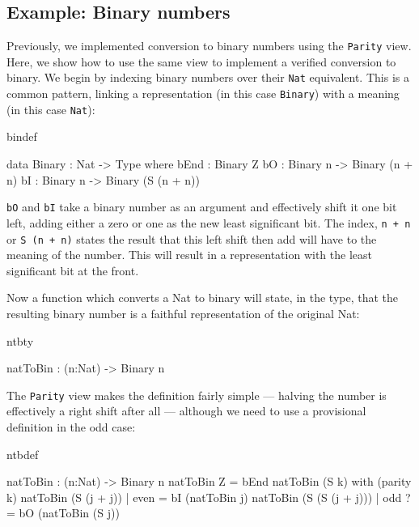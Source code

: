 \subsection{Example: Binary numbers}

Previously, we implemented conversion to binary numbers using the \texttt{Parity} view.
Here, we show how to use the same view to implement a verified conversion to
binary.
We begin by indexing binary numbers over their \texttt{Nat} equivalent. This is a common
pattern, linking a representation (in this case \texttt{Binary}) with a meaning (in this
case \texttt{Nat}):

\begin{SaveVerbatim}{bindef}

data Binary : Nat -> Type where
   bEnd : Binary Z
   bO : Binary n -> Binary (n + n)
   bI : Binary n -> Binary (S (n + n))

\end{SaveVerbatim}

\noindent
\texttt{bO} and \texttt{bI} take a binary number as an argument and effectively shift it one bit
left, adding either a zero or one as the new least significant bit. The index,
\texttt{n + n} or \texttt{S (n + n)} states the result that this left shift then add will
have to the meaning of the number. This will result in a representation with
the least significant bit at the front.

Now a function which converts a Nat to binary will state, in the type, that the
resulting binary number is a faithful representation of the original Nat:

\begin{SaveVerbatim}{ntbty}

natToBin : (n:Nat) -> Binary n

\end{SaveVerbatim}

\noindent
The \texttt{Parity} view makes the definition fairly simple --- halving the
number is effectively a right shift after all --- although we need to use a
provisional definition in the odd case:

\begin{SaveVerbatim}{ntbdef}

natToBin : (n:Nat) -> Binary n
natToBin Z = bEnd
natToBin (S k) with (parity k)
   natToBin (S (j + j))     | even  = bI (natToBin j)
   natToBin (S (S (j + j))) | odd  ?= bO (natToBin (S j))

\end{SaveVerbatim}

